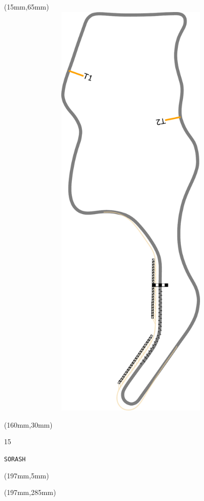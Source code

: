 \begin{textblock*}{185mm}(15mm,65mm)%
\centering
\mbox{\includegraphics[width=185mm,height=210mm,keepaspectratio]{PT/SORASH.pdf}}
\end{textblock*}
\begin{textblock*}{40mm}(160mm,30mm)%
\Large
\par{} 
\par15 
\par\hfill\tiny\tt SORASH\\
\end{textblock*}
\begin{textblock*}{20mm}(197mm,5mm)%
\fbox{\thepage}
\label{SORASH}
\end{textblock*}
\begin{textblock*}{20mm}(197mm,285mm)%
\fbox{\thepage}
\end{textblock*}

